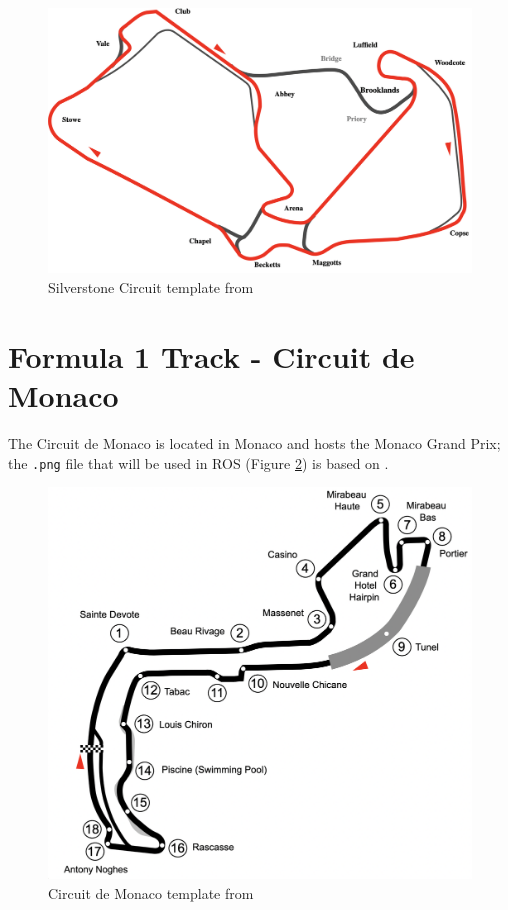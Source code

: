 \begin{figure}[H]
\centering
\includegraphics[scale=0.3]{Figures/silverstone.png}
\caption{Silverstone Circuit template from \cite{wikisilver}}
\label{silverstone}
\end{figure}

\section{Formula 1 Track - Circuit de Monaco}
The Circuit de Monaco is located in Monaco and hosts the Monaco Grand Prix; the \verb |.png| file that will be used in ROS (Figure \ref{monaco}) is based on \cite{wikimonaco}.

\begin{figure}[H]
\centering
\includegraphics[scale=0.3]{Figures/monaco.png}
\caption{Circuit de Monaco template from \cite{wikimonaco}}
\label{monaco}
\end{figure}

